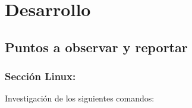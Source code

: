 \documentclass[12pt]{article}
\begin{document}
  \section{Desarrollo}

  
    \subsection{Puntos a observar y reportar}
              
                
      \subsubsection{Sección Linux:}
      Investigación de los siguientes comandos:
\end{document}

